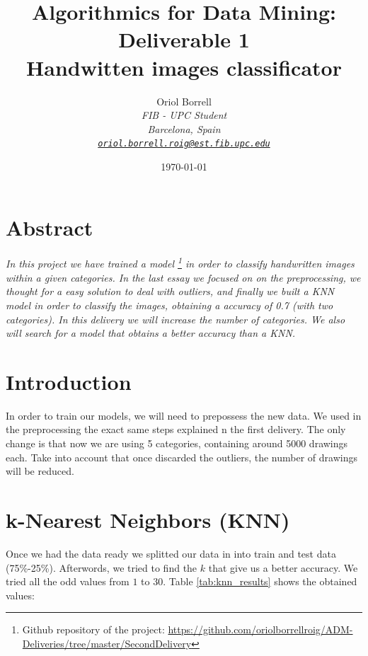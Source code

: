 \documentclass{article}
\title{
\textbf{Algorithmics for Data Mining: Deliverable 1\\} \Large{
    Handwitten images classificator}}
\author{Oriol Borrell\\
\textit{\small FIB - UPC Student} \\
\textit{\small Barcelona, Spain} \\
\textit{\texttt{\href{mailto:oriol.borrell.roig@est.fib.upc.edu}
{\small oriol.borrell.roig@est.fib.upc.edu}}}}
\date{\today}
\begin{document}
\maketitle

\section{Abstract}
\textit{
In this project we have trained a model \footnote{Github repository of the project: \url{https://github.com/oriolborrellroig/ADM-Deliveries/tree/master/SecondDelivery}} in order to classify handwritten images within a given categories. In the last essay we focused on on the preprocessing, we thought for a easy solution to deal with outliers, and finally we built a KNN model in order to classify the images, obtaining a accuracy of 0.7 (with two categories). In this delivery we will increase the number of categories. We also will search for a model that obtains a better accuracy than a KNN.
}

\section{Introduction}
\label{Modeling}
In order to train our models, we will need to prepossess the new data. We used in the preprocessing the exact same steps explained n the first delivery. The only change is that now we are using 5 categories, containing around 5000 drawings each. Take into account that once discarded the outliers, the number of drawings will be reduced. 

\section{k-Nearest Neighbors (KNN)} 
\label{KNN}
Once we had the data ready we splitted our data in into train and test data (75\%-25\%). Afterwords, we tried to find the $k$ that give us a better accuracy. We tried all the odd values from $1$ to $30$. Table \ref{tab:knn_results} shows the obtained values:
\end{document}
